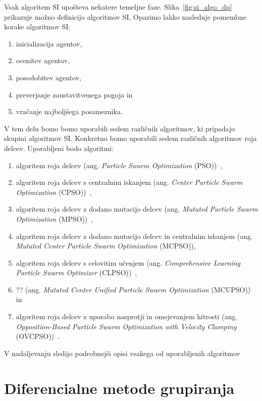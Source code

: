 Vsak algoritem SI upošteva nekatere temeljne faze.
Slika~\ref{fig:si_algo_dp} prikazuje možno definicijo algoritmov SI, 
Opazimo lahko naslednje pomembne korake algoritmov SI:
\begin{enumerate}
    \item inicializacija agentov,
    \item ocenitev agentov,
    \item posodobitev agentov,
    \item preverjanje zaustavitvenega pogoja in
    \item vračanje najboljšega posameznika.
\end{enumerate}
V tem delu bomo bomo uporabili sedem različnih algoritmov, ki pripadajo skupini algoritmov SI.
Konkretno bomo uporabili sedem različnih algoritmov roja delcev.
Uporabljeni bodo algoritmi:
\begin{enumerate}
    \item algoritem roja delcev (ang. \textit{Particle Swarm Optimization} (PSO))~\cite{alg:pso},
    \item algoritem roja delcev s centralnim iskanjem (ang. \textit{Center Particle Swarm Optimization} (CPSO))~\cite{alg:cpso},
    \item algoritem roja delcev z dodano mutacijo delcev (ang. \textit{Mutated Particle Swarm Optimization} (MPSO))~\cite{alg:mpso},
    \item algoritem roja delcev z dodano mutacijo delcev in centralnim iskanjem (ang. \textit{Mutated Center Particle Swarm Optimization} (MCPSO)),
    \item algoritem roja delcev s celovitim učenjem (ang. \textit{Comprehensive Learning Particle Swarm Optimizer} (CLPSO))~\cite{alg:clpso},
    \item ?? (ang. \textit{Mutated Center Unified Particle Swarm Optimization} (MCUPSO))~\cite{alg:mcupso} in
    \item algoritem roja delcev z uporabo nasprotji in omejevanjem hitrosti (ang. \textit{Opposition-Based Particle Swarm Optimization with Velocity Clamping} (OVCPSO))~\cite{alg:ovcpso}.
\end{enumerate}
V nadaljevanju sledijo podrobnejši opisi vsakega od uporabljenih algoritmov 

\section{Diferencialne metode grupiranja}


